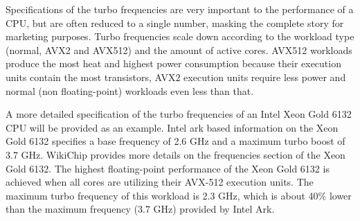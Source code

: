 Specifications of the turbo frequencies are very important to the performance of a CPU, but are often reduced to a single number, masking the complete story for marketing purposes. Turbo frequencies scale down according to the workload type (normal, AVX2 and AVX512) and the amount of active cores. AVX512 workloads produce the most heat and highest power consumption because their execution units contain the most transistors, AVX2 execution units require less power and normal (non floating-point) workloads even less than that.\vspace{5mm} 

A more detailed specification of the turbo frequencies of an Intel Xeon Gold 6132 CPU will be provided as an example. Intel ark based information on the Xeon Gold 6132 specifies a base frequency of 2.6 GHz and a maximum turbo boost of 3.7 GHz\autocite[]{ark_xg6132}. WikiChip provides more details on the frequencies section of the Xeon Gold 6132\autocite[]{wchip_6132}. The highest floating-point performance of the Xeon Gold 6132 is achieved when all cores are utilizing their AVX-512 execution units. The maximum turbo frequency of this workload is 2.3 GHz, which is about 40\% lower than the maximum frequency (3.7 GHz) provided by Intel Ark.

